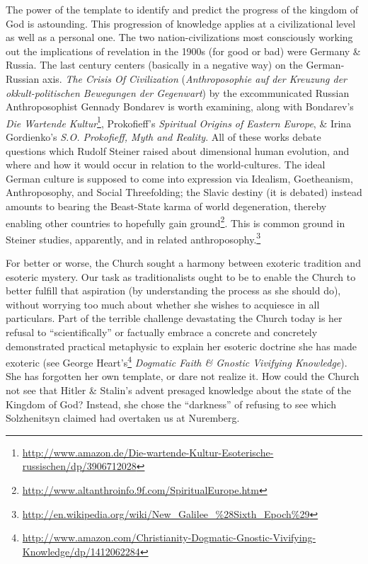 The power of the template to identify and predict the progress of the kingdom of God is astounding. This progression of knowledge applies at a civilizational level as well as a personal one. The two nation-civilizations most consciously working out the implications of revelation in the 1900s (for good or bad) were Germany \& Russia. The last century centers (basically in a negative way) on the German-Russian axis. \emph{The Crisis Of Civilization} (\emph{Anthroposophie auf der Kreuzung der okkult-politischen Bewegungen der Gegenwart}) by the excommunicated Russian Anthroposophist Gennady Bondarev is worth examining, along with Bondarev's \emph{Die Wartende Kultur}\footnote{\url{http://www.amazon.de/Die-wartende-Kultur-Esoterische-russischen/dp/3906712028}}, Prokofieff's \emph{Spiritual Origins of Eastern Europe}, \& Irina Gordienko's \emph{S.O. Prokofieff, Myth and Reality}. All of these works debate questions which Rudolf Steiner raised about dimensional human evolution, and where and how it would occur in relation to the world-cultures. The ideal German culture is supposed to come into expression via Idealism, Goetheanism, Anthroposophy, and Social Threefolding; the Slavic destiny (it is debated) instead amounts to bearing the Beast-State karma of world degeneration, thereby enabling other countries to hopefully gain ground\footnote{\url{http://www.altanthroinfo.9f.com/SpiritualEurope.htm}}. This is common ground in Steiner studies, apparently, and in related anthroposophy.\footnote{\url{http://en.wikipedia.org/wiki/New\_Galilee\_\%28Sixth\_Epoch\%29}}

For better or worse, the Church sought a harmony between exoteric tradition and esoteric mystery. Our task as traditionalists ought to be to enable the Church to better fulfill that aspiration (by understanding the process as she should do), without worrying too much about whether she wishes to acquiesce in all particulars. Part of the terrible challenge devastating the Church today is her refusal to ``scientifically'' or factually embrace a concrete and concretely demonstrated practical metaphysic to explain her esoteric doctrine she has made exoteric (see George Heart's\footnote{\url{http://www.amazon.com/Christianity-Dogmatic-Gnostic-Vivifying-Knowledge/dp/1412062284}} \emph{Dogmatic Faith \& Gnostic Vivifying Knowledge}). She has forgotten her own template, or dare not realize it. How could the Church not see that Hitler \& Stalin's advent presaged knowledge about the state of the Kingdom of God? Instead, she chose the ``darkness'' of refusing to see which Solzhenitsyn claimed had overtaken us at Nuremberg.

